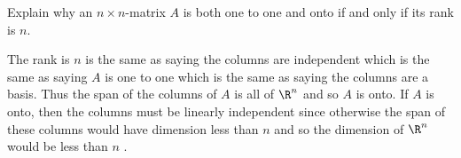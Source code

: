 \begin{ex} Explain why an $n\times n$-matrix $A$ is both one to one and onto if
and only if its rank is $n$. \vspace{1mm}
\begin{sol}
The rank is $n$ is the same as saying the
columns are independent which is the same as saying $A$ is one to one which
is the same as saying the columns are a basis. Thus the span of the columns
of $A$ is all of $\R^{n}$ and so $A$ is onto. If $A$ is onto, then
the columns must be linearly independent since otherwise the span of these
columns would have dimension less than $n$ and so the dimension of $\R^{n}$ would be less than $n$ .
\end{sol}
\end{ex}

